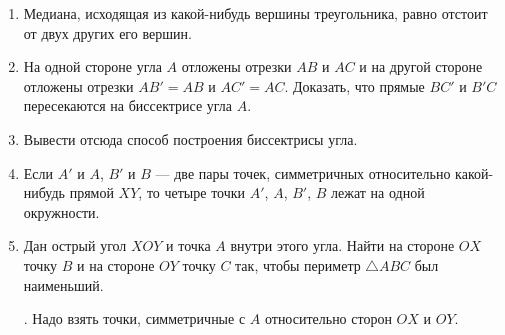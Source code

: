 \documentclass[oneside]{book}
\begin{document}
\begin{enumerate}
 \item
Медиана, исходящая из какой-нибудь вершины треугольника, равно отстоит от двух других его вершин.

 \item
На одной стороне угла $A$ отложены отрезки $AB$ и $AC$ и на другой стороне отложены отрезки $AB'=AB$ и $AC' = AC$.
Доказать, что прямые $BC'$ и $B'C$ пересекаются на биссектрисе угла $A$.

 \item
Вывести отсюда способ построения биссектрисы угла.

 \item
Если $A'$ и $A$, $B'$ и $B$ — две пары точек, симметричных относительно какой-нибудь прямой $XY$, то четыре точки $A'$, $A$, $B'$, $B$ лежат на одной окружности.

 \item
Дан острый угол $XOY$ и точка $A$ внутри этого угла.
Найти на стороне $OX$ точку $B$ и на стороне $OY$ точку $C$ так, чтобы периметр $\triangle ABC$ был наименьший.

\smallskip
{}.
Надо взять точки, симметричные с $A$ относительно сторон $OX$ и $OY$.

\end{enumerate}

\begin{center}
\end{center}
\end{document}

